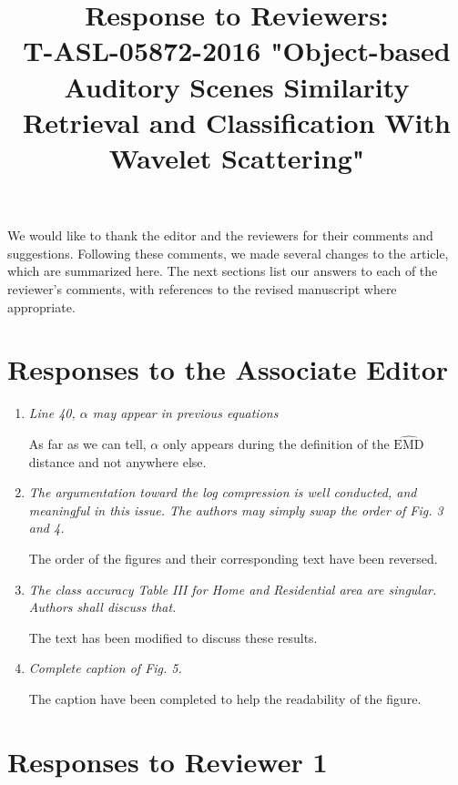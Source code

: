 \documentclass[10pt]{article}
\title{Response to Reviewers: \\ T-ASL-05872-2016 "Object-based Auditory Scenes Similarity Retrieval and Classification With Wavelet Scattering"}
\begin{document}
\maketitle

We would like to thank the editor and the reviewers for their comments and suggestions. Following these comments, we made several changes to the article, which are summarized here. The next sections list our answers to each of the reviewer's comments, with references to the revised manuscript where appropriate.

\section{Responses to the Associate Editor}

\begin{enumerate}

\item \emph{Line 40, $\alpha$ may appear in previous equations}

As far as we can tell, $\alpha$ only appears during the definition of the $\widehat{\mathrm{EMD}}$ distance and not anywhere else.

\item \emph{The argumentation toward the log compression is well conducted, and meaningful in this issue. The authors may simply swap the order of Fig. 3 and 4.}

The order of the figures and their corresponding text have been reversed.

\item \emph{The class accuracy Table III for Home and Residential area are singular. Authors shall discuss that.}

The text has been modified to discuss these results.

\item \emph{Complete caption of Fig. 5.}

The caption have been completed to help the readability of the figure.

\end{enumerate}

\section{Responses to Reviewer 1}
\end{document}
